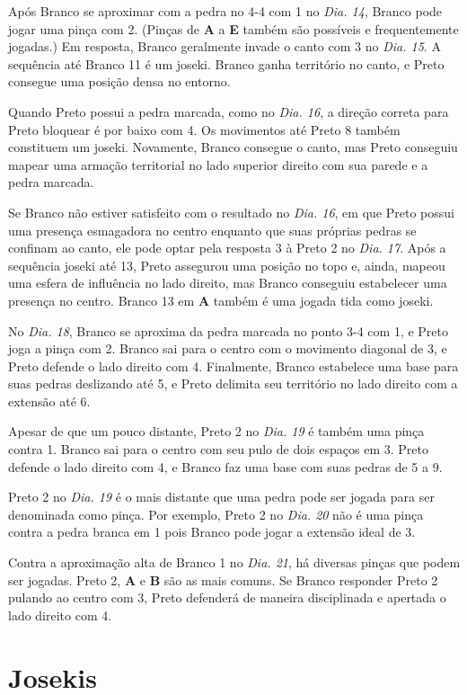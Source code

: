 Após Branco se aproximar com a pedra no 4-4 com 1 no \emph{Dia. 14}, Branco pode jogar uma pinça com 2. (Pinças de \textbf{A} a \textbf{E} também são possíveis e frequentemente jogadas.) Em resposta, Branco geralmente invade o canto com 3 no \emph{Dia. 15}. A sequência até Branco 11 é um joseki. Branco ganha território no canto, e Preto consegue uma posição densa no entorno.

Quando Preto possui a pedra marcada, como no \emph{Dia. 16}, a direção correta para Preto bloquear é por baixo com 4. Os movimentos até Preto 8 também constituem um joseki. Novamente, Branco consegue o canto, mas Preto conseguiu mapear uma armação territorial no lado superior direito com sua parede e a pedra marcada.

Se Branco não estiver satisfeito com o resultado no \emph{Dia. 16}, em que Preto possui uma presença esmagadora no centro enquanto que suas próprias pedras se confinam ao canto, ele pode optar pela resposta 3 à Preto 2 no \emph{Dia. 17}. Após a sequência joseki até 13, Preto assegurou uma posição no topo e, ainda, mapeou uma esfera de influência no lado direito, mas Branco conseguiu estabelecer uma presença no centro. Branco 13 em \textbf{A} também é uma jogada tida como joseki.

No \emph{Dia. 18}, Branco se aproxima da pedra marcada no ponto 3-4 com 1, e Preto joga a pinça com 2. Branco sai para o centro com o movimento diagonal de 3, e Preto defende o lado direito com 4. Finalmente, Branco estabelece uma base para suas pedras deslizando até 5, e Preto delimita seu território no lado direito com a extensão até 6.

Apesar de que um pouco distante, Preto 2 no \emph{Dia. 19} é também uma pinça contra 1. Branco sai para o centro com seu pulo de dois espaços em 3. Preto defende o lado direito com 4, e Branco faz uma base com suas pedras de 5 a 9.

Preto 2 no \emph{Dia. 19} é o mais distante que uma pedra pode ser jogada para ser denominada como pinça. Por exemplo, Preto 2 no \emph{Dia. 20} não é uma pinça contra a pedra branca em 1 pois Branco pode jogar a extensão ideal de 3.

Contra a aproximação alta de Branco 1 no \emph{Dia. 21}, há diversas pinças que podem ser jogadas. Preto 2, \textbf{A} e \textbf{B} são as mais comuns. Se Branco responder Preto 2 pulando ao centro com 3, Preto defenderá de maneira disciplinada e apertada o lado direito com 4.

\section{Josekis}

